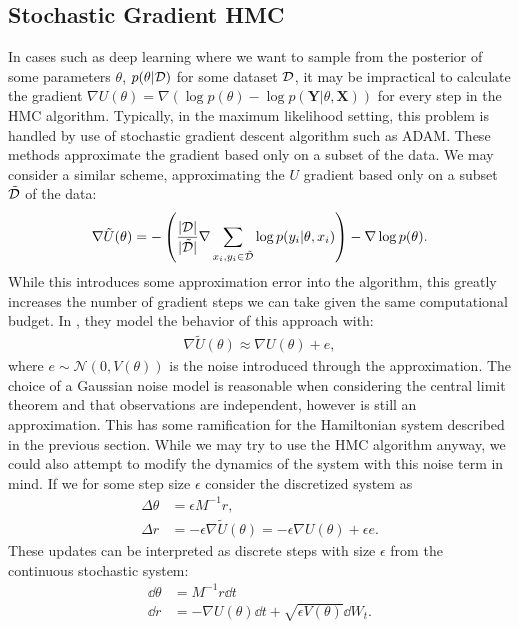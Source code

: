 \subsection{Stochastic Gradient HMC}
In cases such as deep learning where we want to sample from the posterior of some parameters $\theta$,  $p(\theta | \mathcal{D})$ for some dataset $\mathcal{D}$, it may be impractical to calculate the gradient $\nabla U(\theta) = \nabla\left( \log{p(\theta)} - \log{p(\bm{Y} | \theta, \bm{X})} \right)$ for every step in the HMC algorithm. 
Typically, in the maximum likelihood setting, this problem is handled by use of stochastic gradient descent algorithm such as ADAM. 
These methods approximate the gradient based only on a subset of the data. 
We may consider a similar scheme, approximating the $U$ gradient based only on a subset $\tilde{\mathcal{D}}$ of the data:
\begin{align}
    \nabla\tilde{U}(\theta) = -\left(\frac{|\mathcal{D}|}{|\tilde{\mathcal{D}}|}  \nabla \sum_{x_i, y_i\in \tilde{\mathcal{D}}} \log{p(y_i |\theta, x_i)}\right)  -\nabla \log{p(\theta)}.
\end{align}
While this introduces some approximation error into the algorithm, this greatly increases the number of gradient steps we can take given the same computational budget.
In \cite{chen_stochastic_2014}, they model the behavior of this approach with:
\begin{align} \label{eq:sghmc-model}
    \nabla\tilde{U}(\theta) \approx \nabla{U}(\theta) + e,
\end{align}
where $e \sim \mathcal{N}(0, V(\theta))$ is the noise introduced through the approximation.
The choice of a Gaussian noise model is reasonable when considering the central limit theorem and that observations are independent, however is still an approximation.
This has some ramification for the Hamiltonian system described in the previous section. 
While we may try to use the HMC algorithm anyway, we could also attempt to modify the dynamics of the system with this noise term in mind.
If we for some step size $\epsilon$ consider the discretized system as
\begin{align}
    \Delta \theta &=  \epsilon M^{-1} r,\\
    \Delta r &=  -\epsilon\nabla{\tilde{U}}(\theta) = -\epsilon\nabla{U}(\theta)  + \epsilon e.
\end{align}
These updates can be interpreted as discrete steps with size $\epsilon$ from the continuous stochastic system:
\begin{align} 
    \dd{\theta} &= M^{-1} r\dd{t} \\
    \dd{r} &= -\nabla{U}(\theta)\dd{t}  + \sqrt{\epsilon V(\theta)} \dd{W_t}.
\end{align}

